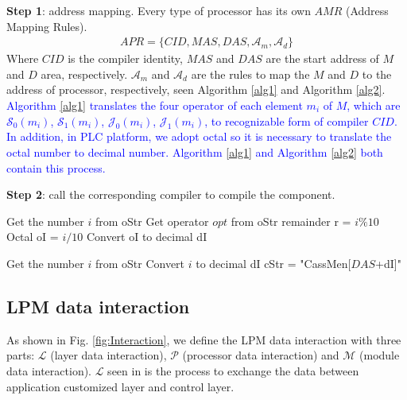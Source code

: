 \documentclass[journal,UTF8]{IEEEtran}
\begin{document}
\textbf{Step 1}: address mapping. Every type of processor has its own $AMR$ (Address Mapping Rules).
 \begin{eqnarray}
  APR = \{CID, MAS, DAS, \mathcal{A}_m, \mathcal{A}_d\}
 \end{eqnarray}
 Where $CID$ is the compiler identity, $MAS$ and $DAS$ are the start address of $M$ and $D$ area, respectively. $\mathcal{A}_m$ and $\mathcal{A}_d$ are the rules to map the $M$ and $D$ to the address of processor, respectively, seen Algorithm \ref{alg1} and Algorithm \ref{alg2}. \textcolor{blue}{Algorithm \ref{alg1} translates the four operator of each element $m_i$ of $M$, which are $\mathcal{S}_0(m_i)$, $\mathcal{S}_1(m_i)$, $\mathcal{J}_0(m_i)$, $\mathcal{J}_1(m_i)$, to recognizable form of compiler $CID$. In addition, in PLC platform, we adopt octal so it is necessary to translate the octal number to decimal number. Algorithm \ref{alg1} and Algorithm \ref{alg2} both contain this process.
 } 
 
\textbf{Step 2}: call the corresponding compiler to compile the component.


\begin{algorithm}
	\label{alg1}
	\caption{$\mathcal{A}_m$}%
	Get the number $i$ from oStr\; 
	Get operator $opt$ from oStr\;
	remainder r = $i\%10$\;
	Octal oI =  $i/10$\;
	Convert oI to decimal dI\; 
	\textcolor{blue}{}
\end{algorithm}
\begin{algorithm}
	\label{alg2}
	\caption{$\mathcal{A}_d$}%
	Get the number $i$ from oStr\; 
	Convert $i$ to decimal dI\; 
	cStr = "CassMen[$DAS$+dI]"\;
\end{algorithm}


 
 \subsection{LPM data interaction}
 As shown in Fig. \ref{fig:Interaction}, we define the LPM data interaction with three parts: $\mathcal{L}$ (layer data interaction), $\mathcal{P}$ (processor data interaction) and $\mathcal{M}$ (module data interaction). $\mathcal{L}$ seen in \cite{WuA} is the process to exchange the data between application customized layer and control layer.
\end{document}
